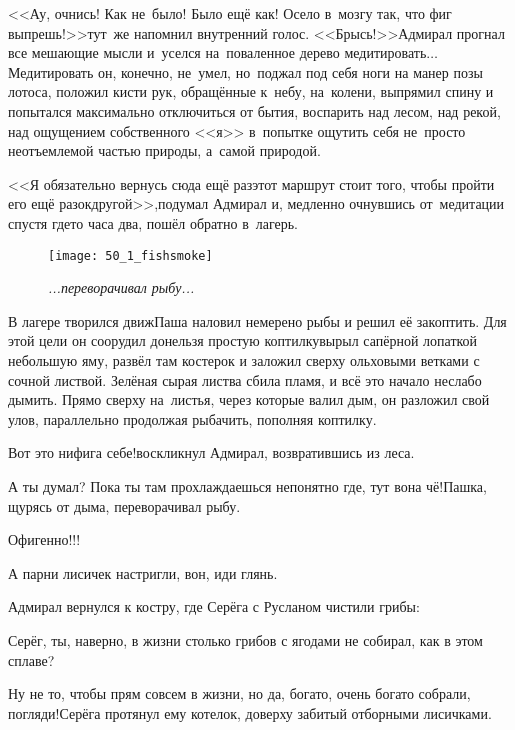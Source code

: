 <<Ау, очнись! Как не~было! Было ещё как! Осело в~мозгу так, что фиг выпрешь!>>\mdash тут~же напомнил внутренний голос. <<Брысь!>>\mdash Адмирал прогнал все мешающие мысли и~уселся на~поваленное дерево медитировать$\ldots$ Медитировать он, конечно, не~умел, но~поджал под себя ноги на манер позы лотоса, положил кисти рук, обращённые к~небу, на~колени, выпрямил спину и попытался максимально отключиться от бытия, воспарить над лесом, над рекой, над ощущением собственного <<я>> в~попытке ощутить себя не~просто неотъемлемой частью природы, а~самой природой.

<<Я обязательно вернусь сюда ещё раз\mdash этот маршрут стоит того, чтобы пройти его ещё разок\sdash другой>>,\mdash подумал Адмирал и, медленно очнувшись от~медитации спустя где\sdash то часа два, пошёл обратно в~лагерь.


\newpage

\begin{wrapfigure}[22]{l}{0.58\textwidth}
	\centering
	\texttt{[image: 50\_1\_fishsmoke]}
	\caption{\small\textit{...переворачивал рыбу...}}
\end{wrapfigure}
В лагере творился движ\mdash Паша наловил немерено рыбы и решил её закоптить. Для этой цели он соорудил донельзя простую коптилку\mdash вырыл сапёрной лопаткой небольшую яму, развёл там костерок и заложил сверху ольховыми ветками с сочной листвой. Зелёная сырая листва сбила пламя, и всё это начало неслабо дымить. Прямо сверху на~листья, через которые валил дым, он разложил свой улов, параллельно продолжая рыбачить, пополняя коптилку.

\diagdash Вот это нифига себе!\mdash воскликнул Адмирал, возвратившись из леса.

\diagdash А ты думал? Пока ты там прохлаждаешься непонятно где, тут вона чё!\mdash Пашка, щурясь от дыма, переворачивал рыбу.

\diagdash Офигенно!!!

\diagdash А парни лисичек настригли, вон, иди глянь.

Адмирал вернулся к костру, где Серёга с Русланом чистили грибы:

\diagdash Серёг, ты, наверно, в жизни столько грибов с ягодами не собирал, как в этом сплаве?

\diagdash Ну не то, чтобы прям совсем в жизни, но да, богато, очень богато собрали, погляди!\mdash Серёга протянул ему котелок, доверху забитый отборными лисичками.

